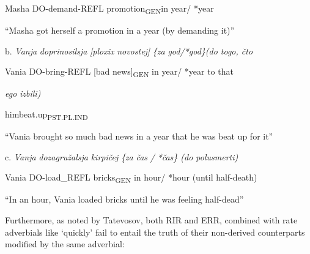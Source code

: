 \documentclass[output=paper,modfonts, nonflat]{langsci/langscibook}
\begin{document}
\begin{styleinnerExample}
    Masha DO-demand-REFL promotion\textsubscript{GEN}in year/     *year
\end{styleinnerExample}

\begin{styleinnerExample}
    “Masha got herself  a promotion in a year (by demanding it)”
\end{styleinnerExample}

\begin{styleinnerExample}
  b.  \textit{Vanja} \textit{doprinosilsja}      \textit{[ploxix} \textit{novostej]} \textit{\{za} \textit{god/*god\}(do togo, čto} 
\end{styleinnerExample}

\begin{styleinnerExample}
    Vania DO-bring-REFL [bad    news]\textsubscript{GEN}  in year/ *year to that 
\end{styleinnerExample}

\begin{styleinnerExample}
    \textit{ego} \textit{izbili)}
\end{styleinnerExample}

\begin{styleinnerExample}
    himbeat.up\textsubscript{PST.PL.IND}
\end{styleinnerExample}

\begin{styleinnerExample}
    “Vania brought so much bad news in a year that he was beat up for it”
\end{styleinnerExample}

\begin{styleinnerExample}
  c.  \textit{Vanja} \textit{dozagružalsja}     \textit{kirpičej}  \textit{\{za} \textit{čas} \textit{/} \textit{*čas\} (do     polusmerti)}
\end{styleinnerExample}

\begin{styleinnerExample}
    Vania DO-load\_REFL bricks\textsubscript{GEN} in hour/ *hour (until half-death)
\end{styleinnerExample}

\begin{styleinnerExample}
    “In an hour, Vania loaded bricks until he was feeling half-dead”
\end{styleinnerExample}

Furthermore, as noted by Tatevosov, both RIR and ERR, combined with rate adverbials like ‘quickly’ fail to entail the truth of their non-derived counterparts modified by the same adverbial:
\end{document}
